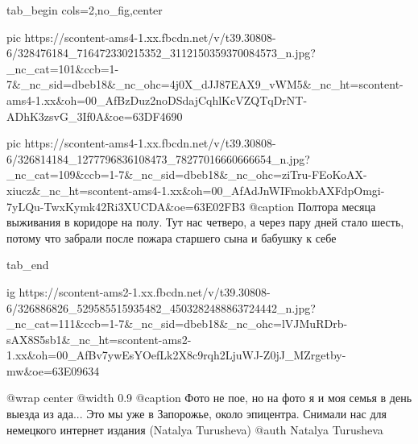  
 
 
 
 


\ifcmt
  tab_begin cols=2,no_fig,center

     pic https://scontent-ams4-1.xx.fbcdn.net/v/t39.30808-6/328476184_716472330215352_3112150359370084573_n.jpg?_nc_cat=101&ccb=1-7&_nc_sid=dbeb18&_nc_ohc=4j0X_dJJ87EAX9_vWM5&_nc_ht=scontent-ams4-1.xx&oh=00_AfBzDuz2noDSdajCqhlKcVZQTqDrNT-ADhK3zsvG_3If0A&oe=63DF4690

     pic https://scontent-ams4-1.xx.fbcdn.net/v/t39.30808-6/326814184_1277796836108473_78277016660666654_n.jpg?_nc_cat=109&ccb=1-7&_nc_sid=dbeb18&_nc_ohc=ziTru-FEoKoAX-xiucz&_nc_ht=scontent-ams4-1.xx&oh=00_AfAdJnWIFmokbAXFdpOmgi-7yLQu-TwxKymk42Ri3XUCDA&oe=63E02FB3
     @caption Полтора месяца выживания в коридоре на полу. Тут нас четверо, а через пару дней стало шесть, потому что забрали после пожара старшего сына и бабушку к себе

  tab_end
\fi

\begin{center}
\begin{minipage}{\textwidth}

\ifcmt
     ig https://scontent-ams2-1.xx.fbcdn.net/v/t39.30808-6/326886826_529585515935482_4503282488863724442_n.jpg?_nc_cat=111&ccb=1-7&_nc_sid=dbeb18&_nc_ohc=lVJMuRDrb-sAX8S5sb1&_nc_ht=scontent-ams2-1.xx&oh=00_AfBv7ywEsYOefLk2X8c9rqh2LjuWJ-Z0jJ_MZrgetby-mw&oe=63E09634

     @wrap center
     @width 0.9
     @caption Фото не пое, но на фото я и моя семья в день выезда из ада... Это мы уже в Запорожье, около эпицентра. Снимали нас для немецкого интернет издания (Natalya Turusheva)
     @auth Natalya Turusheva

\fi
\end{minipage}
\end{center}
